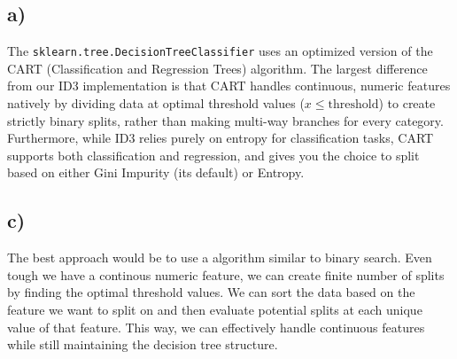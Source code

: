 \documentclass[12pt]{article}
\begin{document}
\subsection*{a)}
The \texttt{sklearn.tree.DecisionTreeClassifier} uses an optimized version of the CART (Classification and Regression Trees) algorithm. The largest difference from our ID3 implementation is that CART handles continuous, numeric features natively by dividing data at optimal threshold values ($x \le \text{threshold}$) to create strictly binary splits, rather than making multi-way branches for every category. Furthermore, while ID3 relies purely on entropy for classification tasks, CART supports both classification and regression, and gives you the choice to split based on either Gini Impurity (its default) or Entropy.

\subsection*{c)}

The best approach would be to use a algorithm similar to binary search. Even tough we have a continous numeric feature, we can create finite number of splits by finding the optimal threshold values. We can sort the data based on the feature we want to split on and then evaluate potential splits at each unique value of that feature. This way, we can effectively handle continuous features while still maintaining the decision tree structure.
\end{document}
